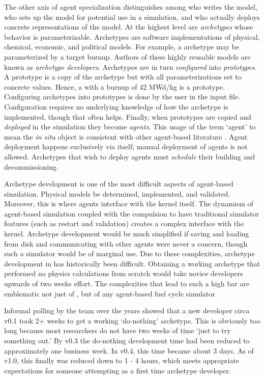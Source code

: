 The other axis of agent specialization distinguishes among who 
writes the model, who sets up the model for potential use in a simulation,
and who actually deploys concrete representations of the model.
At the highest level are \emph{archetypes} whose behavior is parameterizable. 
Archetypes are software implementations
of physical, chemical, economic, and political models.
For example, a   archetype may be 
parameterized by a target burnup. Authors of these highly reusable models 
are known as \emph{archetype developers}. Archetypes are in turn 
\emph{configured} into \emph{prototypes}. A prototype is a copy 
of the archetype but with all parameterizations set to concrete 
values. Hence, a  with a burnup of 42 MWd/kg is a 
prototype. Configuring archetypes into prototypes is done by the \cyclus user 
in the input file. Configuration requires no underlying knowledge of 
how the archetype is implemented, though that often helps.
Finally, when prototypes are copied and \emph{deployed} in the simulation 
they become \emph{agents}. This usage of the term `agent' to mean 
the \emph{in situ} object is consistent with other agent-based
literature \cite{macal2005tutorial}.  Agent deployment happens exclusively via 
\cyclus itself; manual deployment of agents is not allowed.
Archetypes that wish to deploy agents must \emph{schedule} their building
and decommissioning.

Archetype development is one of the most difficult aspects of agent-based
simulation. Physical models be determined, implemented, and 
validated. Moreover, this is where agents interface with the 
\cyclus kernel itself. The dynamism of agent-based simulation 
coupled with the compulsion to have traditional simulator features
(such as restart and validation) creates a complex interface with the kernel.
Archetype development would be much simplified if saving and 
loading from disk and communicating with other agents were 
never a concern, though such a simulator would be of marginal use.
Due to these complexities, archetype development in \cyclus
has historically been difficult. Obtaining a working archetype
that performed no physics calculations from scratch would 
take novice developers upwards of two weeks effort.  The complexities
that lead to such a high bar are emblematic not just of \cyclus,
but of any agent-based fuel cycle simulator.

Informal polling by the \cyclus team over the years
showed that a new developer circa \cyclus v0.1
took 2+ weeks to get a working `do-nothing' archetype. This is obviously 
too long because most researchers do not have two weeks of time `just to try 
something out.' By \cyclus v0.3 the do-nothing development time had been reduced 
to approximately one business week. In \cyclus v0.4, this time became about 3 days.
As of \cyclus v1.0, this finally was reduced down to 1 - 4 hours, which meets
appropriate expectations for someone attempting \cyclus as a first time archetype 
developer.

